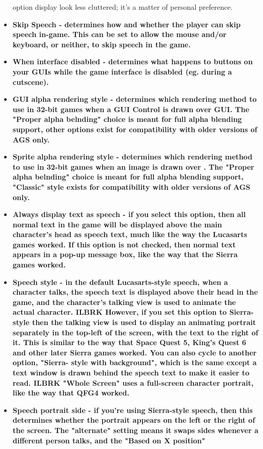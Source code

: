 \begin{itemize}
option display look less cluttered; it's a matter of personal preference.
\item \bf{Skip Speech} - determines how and whether the player can skip speech
in-game. This can be set to allow the mouse and/or keyboard, or neither, to
skip speech in the game.
\item \bf{When interface disabled} - determines what happens to buttons on your
GUIs while the game interface is disabled (eg. during a cutscene).
\item \bf{GUI alpha rendering style} - determines which rendering method to use in 32-bit games when a GUI Control is drawn over GUI. The "Proper alpha belnding" choice is meant for full alpha blending support, other options exist for compatibility with older versions of AGS only.
\item \bf{Sprite alpha rendering style} - determines which rendering method to use in 32-bit games when an image is drawn over .  The "Proper alpha belnding" choice is meant for full alpha blending support, "Classic" style exists for  compatibility with older versions of AGS only.
\item \bf{Always display text as speech} - if you select this option, then all normal
text in the game will be displayed above the main character's head as speech
text, much like the way the Lucasarts games worked. If this option is not
checked, then normal text appears in a pop-up message box, like the way that
the Sierra games worked.
\item \bf{Speech style} - in the default Lucasarts-style speech, when a character talks, the
speech text is displayed above their head in the game, and the character's
talking view is used to animate the actual character. ILBRK
However, if you set this option to Sierra-style then the talking view is used to display an
animating portrait separately in the top-left of the screen, with the text to the right of it.
This is similar to the way that Space Quest 5, King's Quest 6 and other
later Sierra games worked. You can also cycle to another option, "Sierra-
style with background", which is the same except a text window is drawn
behind the speech text to make it easier to read. ILBRK
"Whole Screen" uses a full-screen character portrait, like the way that QFG4 worked.
\item \bf{Speech portrait side} - if you're using Sierra-style speech, then this
determines whether the portrait appears on the left or the right of the screen. The "alternate"
setting means it swaps sides whenever a different person talks, and the "Based on X position"

\end{itemize}
